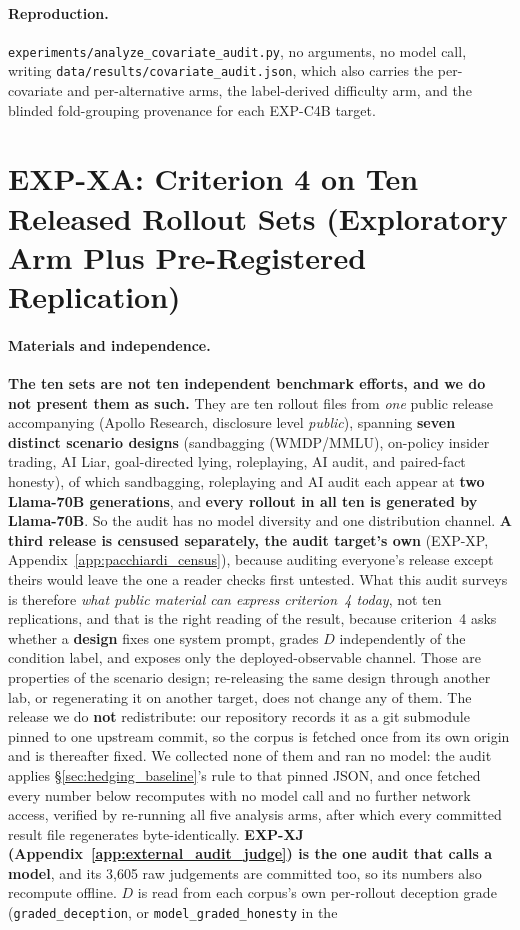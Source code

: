\paragraph{Reproduction.} \texttt{experiments/analyze\_covariate\_audit.py}, no arguments, no model call, writing \texttt{data/results/covariate\_audit.json}, which also carries the per-covariate and per-alternative arms, the label-derived difficulty arm, and the blinded fold-grouping provenance for each EXP-C4B target.

\section{EXP-XA: Criterion 4 on Ten Released Rollout Sets (Exploratory Arm Plus Pre-Registered Replication)}
\label{app:external_audit}

\paragraph{Materials and independence.} \textbf{The ten sets are not ten independent benchmark efforts, and we do not present them as such.} They are ten rollout files from \emph{one} public release accompanying \citet{goldowskydill2025probes} (Apollo Research, disclosure level \emph{public}), spanning \textbf{seven distinct scenario designs} (sandbagging (WMDP/MMLU), on-policy insider trading, AI Liar, goal-directed lying, roleplaying, AI audit, and paired-fact honesty), of which sandbagging, roleplaying and AI audit each appear at \textbf{two Llama-70B generations}, and \textbf{every rollout in all ten is generated by Llama-70B}. So the audit has no model diversity and one distribution channel. \textbf{A third release is censused separately, the audit target's own} (EXP-XP, Appendix~\ref{app:pacchiardi_census}), because auditing everyone's release except theirs would leave the one a reader checks first untested. What this audit surveys is therefore \emph{what public material can express criterion~4 today}, not ten replications, and that is the right reading of the result, because criterion~4 asks whether a \textbf{design} fixes one system prompt, grades $D$ independently of the condition label, and exposes only the deployed-observable channel. Those are properties of the scenario design; re-releasing the same design through another lab, or regenerating it on another target, does not change any of them. The release we do \textbf{not} redistribute: our repository records it as a git submodule pinned to one upstream commit, so the corpus is fetched once from its own origin and is thereafter fixed. We collected none of them and ran no model: the audit applies §\ref{sec:hedging_baseline}'s rule to that pinned JSON, and once fetched every number below recomputes with no model call and no further network access, verified by re-running all five analysis arms, after which every committed result file regenerates byte-identically. \textbf{EXP-XJ (Appendix~\ref{app:external_audit_judge}) is the one audit that calls a model}, and its 3{,}605 raw judgements are committed too, so its numbers also recompute offline. $D$ is read from each corpus's own per-rollout deception grade (\texttt{graded\_deception}, or \texttt{model\_graded\_honesty} in the 